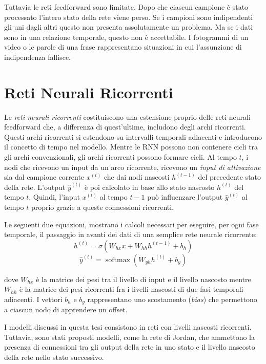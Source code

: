 Tuttavia le reti feedforward sono limitate.
Dopo che ciascun campione \`e stato processato l'intero stato della rete viene perso.
Se i campioni sono indipendenti gli uni dagli altri questo non presenta assolutamente un problema.
Ma se i dati sono in una relazione temporale, questo non \`e accettabile.
I fotogrammi di un video o le parole di una frase rappresentano situazioni in cui l'assunzione di indipendenza fallisce.

\section{Reti Neurali Ricorrenti}
Le \emph{reti neurali ricorrenti} costituiscono una estensione proprio delle reti neurali feedforward che, a differenza di quest'ultime, includono degli archi ricorrenti.
Questi archi ricorrenti si estendono su intervalli temporali adiacenti e introducono il concetto di tempo nel modello.
Mentre le RNN possono non contenere cicli tra gli archi convenzionali, gli archi ricorrenti possono formare cicli.
Al tempo $t$, i nodi che ricevono un input da un arco ricorrente, ricevono un \emph{input di attivazione} sia dal campione corrente $x^{(t)}$ che dai nodi nascosti $h^{(t-1)}$ del precedente stato della rete.
L'output $\hat{y}^{(t)}$ \`e poi calcolato in base allo stato nascosto $h^{(t)}$ del tempo $t$.
Quindi, l'input $x^{(t)}$ al tempo $t-1$ pu\`o influenzare l'output $\hat{y}^{(t)}$ al tempo $t$ proprio grazie a queste connessioni ricorrenti.

Le seguenti due equazioni, mostrano i calcoli necessari per eseguire, per ogni fase temporale, il passaggio in avanti dei dati di una semplice rete neurale ricorrente:
\begin{equation}
  h^{(t)} = \sigma(W_{hx}x + W_{hh}h^{(t-1)} + b_h)
\end{equation}
\begin{equation}
  \hat{y}^{(t)} = \operatorname{softmax}(W_{yh}h^{(t)} + b_y)
\end{equation}

dove $W_{hx}$ \`e la matrice dei pesi tra il livello di input e il livello nascosto mentre $W_{hh}$ \`e la matrice dei pesi ricorrenti fra i livelli nascosti di due fasi temporali adiacenti.
I vettori $b_h$ e $b_y$ rappresentano uno scostamento (\emph{bias}) che permettono a ciascun nodo di apprendere un offset.

I modelli discussi in questa tesi consistono in reti con livelli nascosti ricorrenti.
Tuttavia, sono stati proposti modelli, come la rete di Jordan, che ammettono la presenza di connessioni tra gli output della rete in uno stato e il livello nascosto della rete nello stato successivo.

